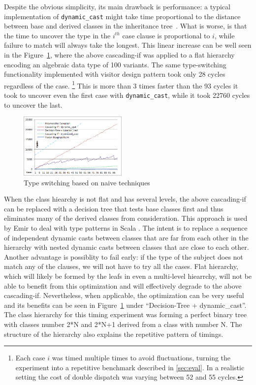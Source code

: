 \documentclass[preprint]{sigplanconf}
\makeatletter
\DeclareRobustCommand{\code}[1]{{\lstinline[breaklines=false,escapechar=@]{#1}}}
\makeatother
\begin{document}
Despite the obvious simplicity, its main drawback is performance: a typical 
implementation of \code{dynamic_cast} might take time proportional to the 
distance between base and derived classes in the inheritance tree~\cite{}.
What is worse, is that the time to uncover the type in the $i^{th}$ case clause 
is proportional to $i$, while failure to match will always take the longest. 
This linear increase can be well seen in the Figure~\ref{fig:DCastVis1}, where 
the above cascading-if was applied to a flat hierarchy encoding an algebraic 
data type of 100 variants. The same type-switching functionality implemented 
with visitor design pattern took only 28 cycles regardless of the case.
\footnote{Each case $i$ was timed multiple times to avoid fluctuations, turning 
the experiment into a repetitive benchmark described in 
\textsection\ref{sec:eval}. In a realistic setting the cost of double dispatch 
was varying between 52 and 55 cycles.}
This is more than 3 times faster than the 93 cycles it took to uncover even the 
first case with \code{dynamic_cast}, while it took 22760 cycles to uncover the 
last.

\begin{figure}[htbp]
  \centering
    \includegraphics[width=0.47\textwidth]{DCast-vs-Visitors1.png}
  \caption{Type switching based on naive techniques}
  \label{fig:DCastVis1}
\end{figure}

When the class hiearchy is not flat and has several levels, the above 
cascading-if can be replaced with a decision tree that tests base classes first 
and thus eliminates many of the derived classes from consideration. This 
approach is used by Emir to deal with type patterns in Scala
\cite[]{EmirThesis}. The intent is to replace a sequence of 
independent dynamic casts between classes that are far from each other in the 
hierarchy with nested dynamic casts between classes that are close to each 
other. Another advantage is possiblity to fail early: if the type of the subject 
does not match any of the clauses, we will not have to try all the cases. 
Flat hierarchy, which will likely be formed by the leafs in even a multi-level 
hiearrchy, will not be able to benefit from this optimization and 
will effectively degrade to the above cascading-if. Nevertheless, when 
applicable, the optimization can be very useful and its benefits can be seen in
Figure~\ref{fig:DCastVis1} under ``Decision-Tree + dynamic\_cast''. The class 
hierarchy for this timing experiment was forming a perfect binary tree with 
classes number 2*N and 2*N+1 derived from a class with number N. The structure 
of the hierarchy also explains the repetitive pattern of timings.
\end{document}
